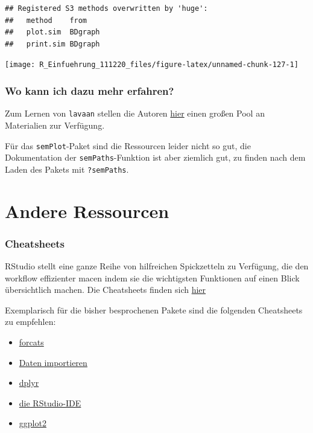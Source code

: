\documentclass[
]{book}
\begin{document}
\begin{verbatim}
## Registered S3 methods overwritten by 'huge':
##   method    from   
##   plot.sim  BDgraph
##   print.sim BDgraph
\end{verbatim}

\begin{center}\texttt{[image: R\_Einfuehrung\_111220\_files/figure-latex/unnamed-chunk-127-1]} \end{center}

\hypertarget{wo-kann-ich-dazu-mehr-erfahren-4}{%
\subsubsection{Wo kann ich dazu mehr erfahren?}\label{wo-kann-ich-dazu-mehr-erfahren-4}}

Zum Lernen von \texttt{lavaan} stellen die Autoren \href{https://lavaan.ugent.be/resources/teaching.html}{hier} einen großen Pool an Materialien zur Verfügung.

Für das \texttt{semPlot}-Paket sind die Ressourcen leider nicht so gut, die Dokumentation der \texttt{semPaths}-Funktion ist aber ziemlich gut, zu finden nach dem Laden des Pakets mit \texttt{?semPaths}.

\hypertarget{andere-ressourcen}{%
\section{Andere Ressourcen}\label{andere-ressourcen}}

\hypertarget{cheatsheets}{%
\subsubsection{Cheatsheets}\label{cheatsheets}}

RStudio stellt eine ganze Reihe von hilfreichen Spickzetteln zu Verfügung, die den workflow effizienter macen indem sie die wichtigsten Funktionen auf einen Blick übersichtlich machen. Die Cheatsheets finden sich \href{https://rstudio.com/resources/cheatsheets/}{hier}

Exemplarisch für die bisher besprochenen Pakete sind die folgenden Cheatsheets zu empfehlen:

\begin{itemize}
\item
  \href{https://github.com/rstudio/cheatsheets/raw/master/factors.pdf}{forcats}
\item
  \href{https://github.com/rstudio/cheatsheets/raw/master/data-import.pdf}{Daten importieren}
\item
  \href{https://github.com/rstudio/cheatsheets/raw/master/data-transformation.pdf}{dplyr}
\item
  \href{https://github.com/rstudio/cheatsheets/raw/master/rstudio-ide.pdf}{die RStudio-IDE}
\item
  \href{https://github.com/rstudio/cheatsheets/raw/master/data-visualization-2.1.pdf}{ggplot2}
\end{itemize}
\end{document}
